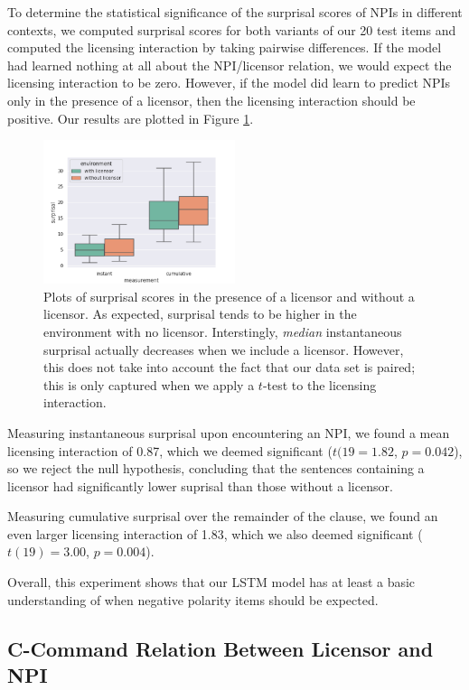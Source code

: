 \documentclass[11pt, round]{article}
\begin{document}
To determine the statistical significance of the surprisal scores of NPIs in different contexts, we computed surprisal scores for both variants of our 20 test items and computed the licensing interaction by taking pairwise differences. If the model had learned nothing at all about the NPI/licensor relation, we would expect the licensing interaction to be zero. However, if the model did learn to predict NPIs only in the presence of a licensor, then the licensing interaction should be positive. Our results are plotted in Figure \ref{fig:basic-detection-box-plot}.

\begin{figure}
    \centering
    \includegraphics[width=0.5\textwidth]{surprisal-c-command-box-plot}
    \caption{Plots of surprisal scores in the presence of a licensor and without a licensor. As expected, surprisal tends to be higher in the environment with no licensor. Interstingly, \textit{median} instantaneous surprisal actually decreases when we include a licensor. However, this does not take into account the fact that our data set is paired; this is only captured when we apply a $t$-test to the licensing interaction.}
    \label{fig:basic-detection-box-plot}
\end{figure}

Measuring instantaneous surprisal upon encountering an NPI, we found a mean licensing interaction of 0.87, which we deemed significant ($t(19 = 1.82$, $p = 0.042$), so we reject the null hypothesis, concluding that the sentences containing a licensor had significantly lower suprisal than those without a licensor.

Measuring cumulative surprisal over the remainder of the clause, we found an even larger licensing interaction of 1.83, which we also deemed significant ($t(19) = 3.00$, $p = 0.004$).

Overall, this experiment shows that our LSTM model has at least a basic understanding of when negative polarity items should be expected.

\subsection{C-Command Relation Between Licensor and NPI}
\label{sec:c-command}
\end{document}
